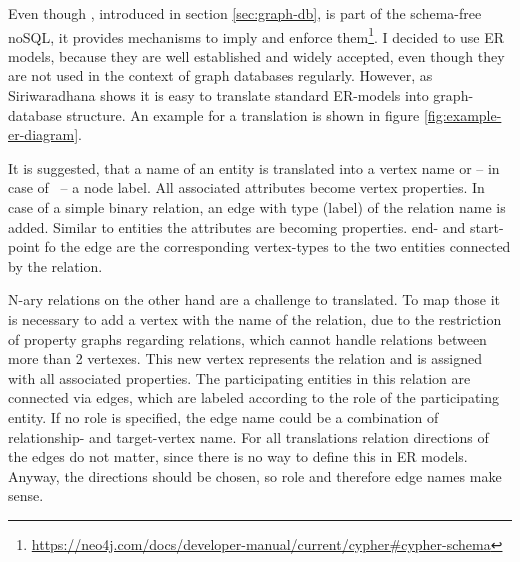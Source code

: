 	Even though \neoj, introduced in section \ref{sec:graph-db}, is part of the schema-free noSQL, it provides mechanisms to imply and enforce them\footnote{\url{https://neo4j.com/docs/developer-manual/current/cypher\#cypher-schema}}.
	I decided to use ER models, because they are well established and widely accepted, even though they are not used in the context of graph databases regularly.
	However, as Siriwaradhana shows it is easy to translate standard ER-models into graph-database structure. \cite{Siriwaradhana2014}
	An example for a translation is shown in figure \ref{fig:example-er-diagram}.
	
	It is suggested, that a name of an entity is translated into a vertex name or -- in case of \neoj\ -- a node label. All associated attributes become vertex properties.
	In case of a simple binary relation, an edge with type (\neoj label) of the relation name is added. Similar to entities the attributes are becoming properties. end- and start-point fo the edge are the corresponding vertex-types to the two entities connected by the relation.
	
	N-ary relations on the other hand are a challenge to translated. To map those it is necessary to add a vertex with the name of the relation, due to the restriction of property graphs regarding relations, which cannot handle relations between more than 2 vertexes.
	This new vertex represents the relation and is assigned with all associated properties. The participating entities in this relation are connected via edges, which are labeled according to the role of the participating entity. If no role is specified, the edge name could be a combination of relationship- and target-vertex name.
	For all translations relation directions of the edges do not matter, since there is no way to define this in ER models. Anyway, the directions should be chosen, so role and therefore edge names make sense.

	
